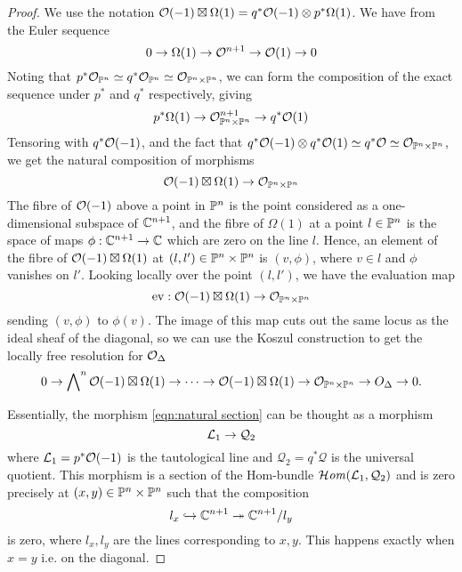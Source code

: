 \begin{proof}
    We use the notation $\O(-1)\boxtimes\Omega(1)=q^*\O(-1)\otimes p^*\Omega(1)$. We have from \cite{Hartshorne} the Euler sequence
    \begin{equation*}
        0 \to \Omega(1) \to \O^{n+1} \to \O(1) \to 0
    \end{equation*}
    Noting that $p^*\O_{\P^n}\simeq q^*\O_{\P^n}\simeq\O_{\P^n\times\P^n}$, we can form the composition of the exact sequence under $p^*$ and $q^*$ respectively, giving
    \begin{equation*}
        p^*\Omega(1) \to \O_{\P^n\times\P^n}^{n+1}\to q^*\O(1)
    \end{equation*}
    Tensoring with $q^*\O(-1)$, and the fact that $q^*\O(-1)\otimes q^*\O(1)\simeq q^*\O\simeq\O_{\P^n\times\P^n}$, we get the natural composition of morphisms
    \begin{equation}\label{eqn:natural section}
        \O(-1)\boxtimes\Omega(1) \to \O_{\P^n\times\P^n}
    \end{equation}
    The fibre of $\O(-1)$ above a point in $\P^n$ is the point considered as a one-dimensional subspace of $\C^{n+1}$, and the fibre of $\Omega(1)$ at a point $l \in \P^n$ is the space of maps $\phi : \C^{n+1}\to \C$ which are zero on the line $l$. Hence, an element of the fibre of  $\O(-1)\boxtimes \Omega (1)$ at $(l,l') \in \P^{n}\times \P^n$ is $(v,\phi)$, where $v \in l$ and $\phi$ vanishes on $l'$. Looking locally over the point $(l,l')$, we have the evaluation map
    \begin{equation*}
        \ev : \O(-1)\boxtimes \Omega (1) \to \O_{\P^{n}\times \P^{n}}
    \end{equation*}
    sending $(v,\phi)$ to $\phi(v)$. The image of this map cuts out the same locus as the ideal sheaf of the diagonal, so we can use the Koszul construction to get the locally free resolution for $\O_\Delta$
    \begin{equation*}
        0 \to \bigwedge\nolimits^{n}\O(-1)\boxtimes\Omega(1) \to \dots\to \O(-1)\boxtimes\Omega(1)\to \O_{\P^{n}\times \P^{n}} \to O_{\Delta}\to 0.
    \end{equation*}

    Essentially, the morphism \ref{eqn:natural section} can be thought as a morphism $$\calL_1 \rightarrow \mathcal{Q}_2$$where $\calL_1=p^*\O(-1)$ is the tautological line and $\mathcal{Q}_2=q^*\mathcal{Q}$ is the universal quotient. This morphism is a section of the Hom-bundle $\lHom(\calL_1, \mathcal{Q}_2)$ and is zero precisely at $(x,y)\in \P^{n}\times \P^n$ such that the composition $$l_x \hookrightarrow \C^{n+1}\twoheadrightarrow \C^{n+1}/l_y$$
    is zero, where $l_x, l_y$ are the lines corresponding to $x,y$. This happens exactly when $x=y$ i.e. on the diagonal.



\end{proof}
